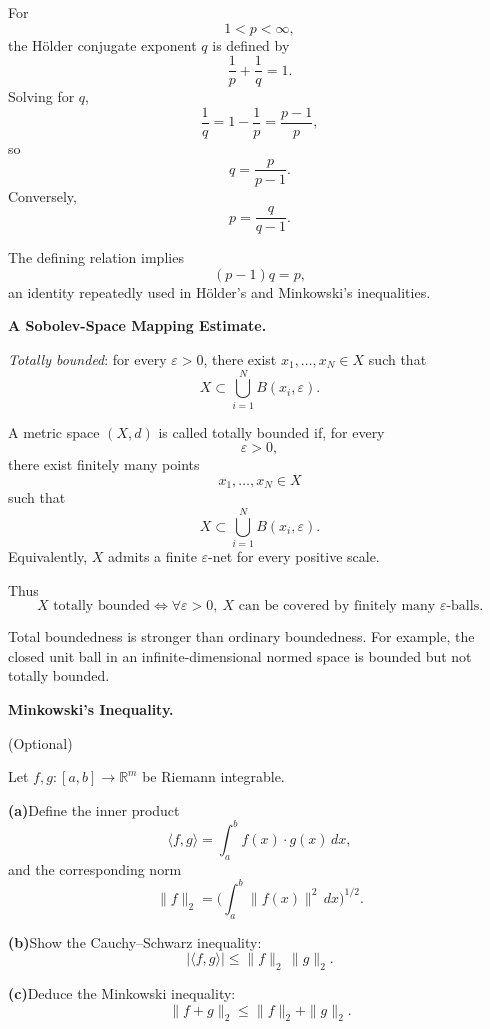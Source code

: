 \begin{solution}
For
\[
1<p<\infty,
\]
the Hölder conjugate exponent \(q\) is defined by
\[
\frac1p+\frac1q=1.
\]
Solving for \(q\),
\[
\frac1q
=
1-\frac1p
=
\frac{p-1}{p},
\]
so
\[
\boxed{
q=\frac{p}{p-1}.
}
\]
Conversely,
\[
p=\frac{q}{q-1}.
\]

The defining relation implies
\[
(p-1)q=p,
\]
an identity repeatedly used in Hölder's and Minkowski's inequalities.
\end{solution}


\begin{problem}[CP-II-0288]
\label{prob:cp-ii-0288}
\textbf{A Sobolev-Space Mapping Estimate.}

\hspace*{1.5em}\emph{Totally bounded}: for every $\varepsilon>0$, there exist $x_1,\dots,x_N\in X$ such that
	\[
	X \subset \bigcup_{i=1}^N B(x_i,\varepsilon).
	\]
\end{problem}

\begin{solution}
A metric space \((X,d)\) is called totally bounded if, for every
\[
\varepsilon>0,
\]
there exist finitely many points
\[
x_1,\ldots,x_N\in X
\]
such that
\[
X
\subset
\bigcup_{i=1}^{N}B(x_i,\varepsilon).
\]
Equivalently, \(X\) admits a finite \(\varepsilon\)-net for every positive scale.

Thus
\[
\boxed{
X\text{ totally bounded}
\iff
\forall\varepsilon>0,\
X\text{ can be covered by finitely many }\varepsilon\text{-balls}.
}
\]

Total boundedness is stronger than ordinary boundedness. For example, the closed unit ball in
an infinite-dimensional normed space is bounded but not totally bounded.
\end{solution}


\begin{problem}[CP-II-0289]
\label{prob:cp-ii-0289}
\textbf{Minkowski's Inequality.}

\hspace*{1.5em}(Optional)

Let $f,g:[a,b]\to\mathbb{R}^m$ be Riemann integrable.

	\par\smallskip\noindent\textbf{(a)}\quad Define the inner product
	\[
	\langle f,g\rangle = \int_a^b f(x)\cdot g(x)\,dx,
	\]
	and the corresponding norm
	\[
	\|f\|_2 = \Big(\int_a^b \|f(x)\|^2\,dx\Big)^{1/2}.
	\]

	\par\smallskip\noindent\textbf{(b)}\quad Show the Cauchy--Schwarz inequality:
	\[
	|\langle f,g\rangle| \leq \|f\|_2 \,\|g\|_2.
	\]

	\par\smallskip\noindent\textbf{(c)}\quad Deduce the Minkowski inequality:
	\[
	\|f+g\|_2 \leq \|f\|_2+\|g\|_2.
	\]
\end{problem}

